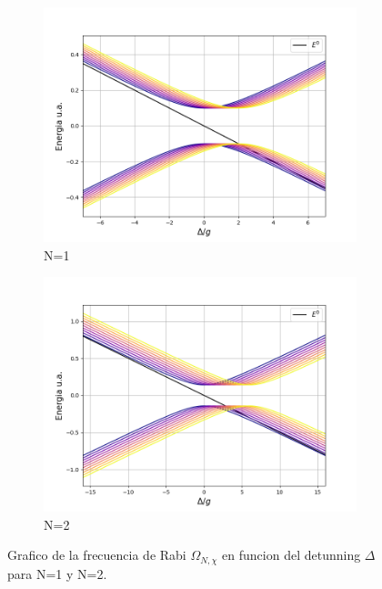 \begin{figure}[H]
    \centering
    \begin{subfigure}[h]{0.49\textwidth}
        \centering
        \includegraphics[width=\textwidth]{figuras/ch3/relacion energia detunning jcm simple kerr.png}
        \caption{N=1}
        \label{fig3:relacion energia detunning kerr 1}
    \end{subfigure}
    \hfill
    \begin{subfigure}[h]{0.49\textwidth}
        \centering
        \includegraphics[width=\textwidth]{figuras/ch3/relacion energia detunning jcm simple kerr 2.png}
        \caption{N=2}
        \label{fig3:relacion energia detunning kerr 2}
    \end{subfigure}
    \caption{Grafico de la frecuencia de Rabi $\Omega_{N,\chi}$ en funcion del detunning $\Delta$ para N=1 y N=2.}
    \label{fig3:relacion energia detunning kerr}
\end{figure}


